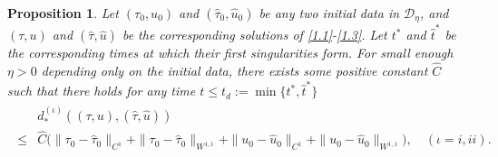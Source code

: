 \documentclass[11pt,reqno]{article}
\newtheorem{prop}{Proposition}
\numberwithin{equation}{section}
\begin{document}
\begin{prop}\label{prop2}
Let $(\tau_0, u_0)$ and $(\hat{\tau}_0, \hat{u}_0)$ be any two initial data
in $\mathcal{D}_\eta$, and $(\tau, u)$ and $(\hat{\tau}, \hat{u})$ be the corresponding solutions of \eqref{1.1}-\eqref{1.3}. Let $t^*$ and $\hat{t}^*$ be the corresponding times at which their first singularities form. For small enough $\eta>0$ depending only on the initial data, there exists some positive constant $\widehat{C}$ such that there holds for any time $t\leq t_d:=\min\{t^*, \hat{t}^*\}$
\begin{align}\label{7.31a}
\begin{split}
&d_{*}^{(\iota)}((\tau, u), (\hat{\tau}, \hat{u})) \\
\leq & \widehat{C}\Big(\|\tau_0-\hat{\tau}_0\|_{C^1} + \|\tau_0-\hat{\tau}_0\|_{W^{1,1}} + \|u_0-\hat{u}_0\|_{C^1}+  \|u_0-\hat{u}_0\|_{W^{1,1}} \Big), \quad (\iota=i, ii).
\end{split}
\end{align}
\end{prop}
\end{document}

